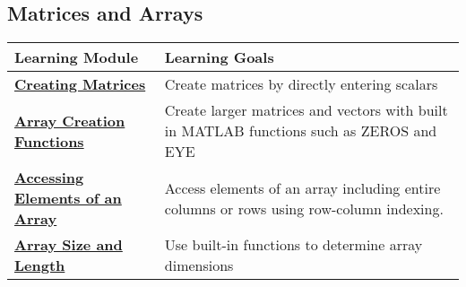 \documentclass[11pt]{article}
\begin{document}
\subsection{Matrices and Arrays}\label{matrices-and-arrays}

\begin{longtable}[]{@{}ll@{}}
\toprule
\begin{minipage}[b]{0.29\columnwidth}\raggedright\strut
\textbf{Learning Module}\strut
\end{minipage} & \begin{minipage}[b]{0.29\columnwidth}\raggedright\strut
\textbf{Learning Goals}\strut
\end{minipage}\tabularnewline
\midrule
\endhead
\begin{minipage}[t]{0.29\columnwidth}\raggedright\strut
\textbf{\href{http://youtu.be/5tm6PKaJdI8}{Creating Matrices}}\strut
\end{minipage} & \begin{minipage}[t]{0.29\columnwidth}\raggedright\strut
Create matrices by directly entering scalars\strut
\end{minipage}\tabularnewline
\begin{minipage}[t]{0.29\columnwidth}\raggedright\strut
\textbf{\href{http://youtu.be/DDnm7vek6KY}{Array Creation
Functions}}\strut
\end{minipage} & \begin{minipage}[t]{0.29\columnwidth}\raggedright\strut
Create larger matrices and vectors with built in MATLAB functions such
as ZEROS and EYE\strut
\end{minipage}\tabularnewline
\begin{minipage}[t]{0.29\columnwidth}\raggedright\strut
\textbf{\href{http://youtu.be/qqQnFp5aiuM}{Accessing Elements of an
Array}}\strut
\end{minipage} & \begin{minipage}[t]{0.29\columnwidth}\raggedright\strut
Access elements of an array including entire columns or rows using
row-column indexing.\strut
\end{minipage}\tabularnewline
\begin{minipage}[t]{0.29\columnwidth}\raggedright\strut
\textbf{\href{http://youtu.be/SqvtT_VspKU}{Array Size and Length}}\strut
\end{minipage} & \begin{minipage}[t]{0.29\columnwidth}\raggedright\strut
Use built-in functions to determine array dimensions\strut
\end{minipage}\tabularnewline

\end{longtable}
\end{document}
